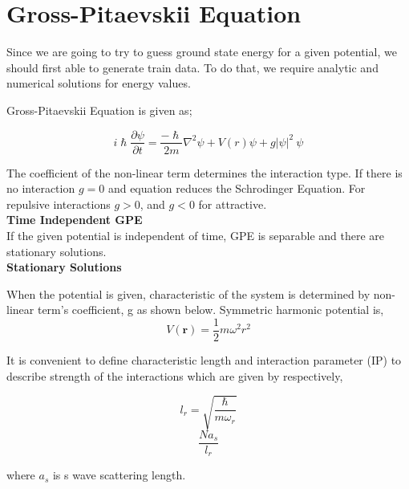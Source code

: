 \documentclass[%
 reprint,
 amsmath,amssymb,
 aps,
]{revtex4-1}
\begin{document}

\section{\label{sec:level1}Gross-Pitaevskii Equation}

Since we are going to try to guess ground state energy for a given potential,
we should first able to generate train data. To do that, we require analytic
and numerical solutions for energy values. 

Gross-Pitaevskii Equation is given as;

$$ i\hslash \frac {\partial \psi}{\partial t} = \frac {-\hslash}{2m} \nabla^2
\psi + V(r)\psi + g|\psi|^2\ \psi  $$

The coefficient of the non-linear term determines the interaction type. 
If there is no interaction $g = 0$ and equation reduces the Schrodinger Equation. For repulsive interactions
$g > 0$, and $g < 0$ for attractive. \\


%


\textbf{Time Independent GPE}\\
If the given potential is independent of time, GPE is separable and there are
stationary solutions. \\


\textbf{Stationary Solutions}

When the potential is given, characteristic of the system is determined by
non-linear term's coefficient, g as shown below. Symmetric harmonic potential is,
$$ V(\textbf{r}) = \frac{1}{2}m\omega^2 r^2 $$

It is convenient to define characteristic length and interaction parameter (IP) to describe strength of the interactions which are given by respectively,

$$ l_r = \sqrt{\frac{\hslash}{m \omega_r}}$$ 
$$  \frac{N a_s}{l_r} $$ 

where $a_s$ is s wave scattering length.
\end{document}
